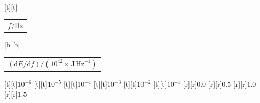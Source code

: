 %    
%
%
\begin{psfrags}%
\psfragscanon%
%
[t][t]{\color[rgb]{0,0,0}\setlength{\tabcolsep}{0pt}\begin{tabular}{c}{\Large$f/\mathrm{Hz}$}\end{tabular}}%
[b][b]{\color[rgb]{0,0,0}\setlength{\tabcolsep}{0pt}\begin{tabular}{c}{\Large$(\mathrm{d}E/\mathrm{d}{f})/(10^{42} \times \mathrm{J\,Hz}^{-1})$}\end{tabular}}%
%
[t][t]{$10^{-6}$}%
[t][t]{$10^{-5}$}%
[t][t]{$10^{-4}$}%
[t][t]{$10^{-3}$}%
[t][t]{$10^{-2}$}%
[t][t]{$10^{-1}$}%
%
[r][r]{$0.0$}%
[r][r]{$0.5$}%
[r][r]{$1.0$}%
[r][r]{$1.5$}%
%
%
\end{psfrags}%
%
